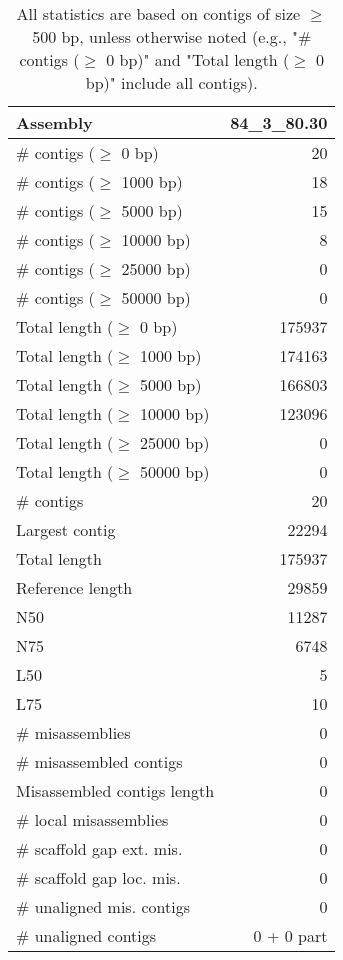 \documentclass[12pt,a4paper]{article}
\begin{document}
\begin{table}[ht]
\begin{center}
\caption{All statistics are based on contigs of size $\geq$ 500 bp, unless otherwise noted (e.g., "\# contigs ($\geq$ 0 bp)" and "Total length ($\geq$ 0 bp)" include all contigs).}
\begin{tabular}{|l*{1}{|r}|}
\hline
Assembly & 84\_3\_80.30 \\ \hline
\# contigs ($\geq$ 0 bp) & 20 \\ \hline
\# contigs ($\geq$ 1000 bp) & 18 \\ \hline
\# contigs ($\geq$ 5000 bp) & 15 \\ \hline
\# contigs ($\geq$ 10000 bp) & 8 \\ \hline
\# contigs ($\geq$ 25000 bp) & 0 \\ \hline
\# contigs ($\geq$ 50000 bp) & 0 \\ \hline
Total length ($\geq$ 0 bp) & 175937 \\ \hline
Total length ($\geq$ 1000 bp) & 174163 \\ \hline
Total length ($\geq$ 5000 bp) & 166803 \\ \hline
Total length ($\geq$ 10000 bp) & 123096 \\ \hline
Total length ($\geq$ 25000 bp) & 0 \\ \hline
Total length ($\geq$ 50000 bp) & 0 \\ \hline
\# contigs & 20 \\ \hline
Largest contig & 22294 \\ \hline
Total length & 175937 \\ \hline
Reference length & 29859 \\ \hline
N50 & 11287 \\ \hline
N75 & 6748 \\ \hline
L50 & 5 \\ \hline
L75 & 10 \\ \hline
\# misassemblies & 0 \\ \hline
\# misassembled contigs & 0 \\ \hline
Misassembled contigs length & 0 \\ \hline
\# local misassemblies & 0 \\ \hline
\# scaffold gap ext. mis. & 0 \\ \hline
\# scaffold gap loc. mis. & 0 \\ \hline
\# unaligned mis. contigs & 0 \\ \hline
\# unaligned contigs & 0 + 0 part \\ \hline

\end{tabular}
\end{center}
\end{table}
\end{document}
